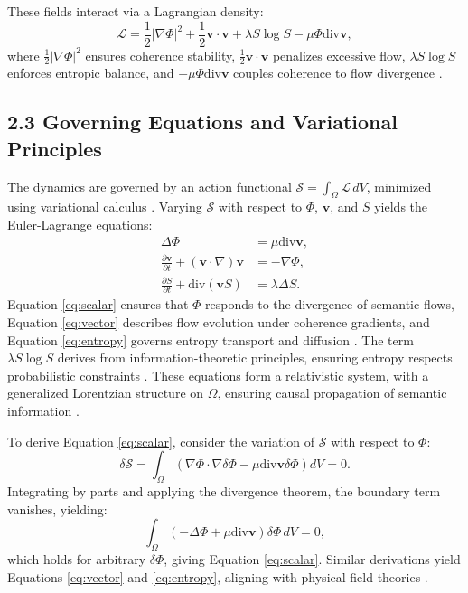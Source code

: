 \documentclass[12pt]{article}
\begin{document}
These fields interact via a Lagrangian density:
\[
\mathcal{L} = \frac{1}{2} |\nabla \Phi|^2 + \frac{1}{2} \mathbf{v} \cdot \mathbf{v} + \lambda S \log S - \mu \Phi \text{div} \mathbf{v},
\]
where \(\frac{1}{2} |\nabla \Phi|^2\) ensures coherence stability, \(\frac{1}{2} \mathbf{v} \cdot \mathbf{v}\) penalizes excessive flow, \(\lambda S \log S\) enforces entropic balance, and \(-\mu \Phi \text{div} \mathbf{v}\) couples coherence to flow divergence \citep{atiyah1969}.

\subsection{2.3 Governing Equations and Variational Principles}

The dynamics are governed by an action functional \(\mathcal{S} = \int_{\Omega} \mathcal{L} \, dV\), minimized using variational calculus \citep{atiyah1969}. Varying \(\mathcal{S}\) with respect to \(\Phi\), \(\mathbf{v}\), and \(S\) yields the Euler-Lagrange equations:
\begin{align}
\Delta \Phi &= \mu \text{div} \mathbf{v}, \label{eq:scalar} \\
\frac{\partial \mathbf{v}}{\partial t} + (\mathbf{v} \cdot \nabla) \mathbf{v} &= -\nabla \Phi, \label{eq:vector} \\
\frac{\partial S}{\partial t} + \text{div} (\mathbf{v} S) &= \lambda \Delta S. \label{eq:entropy}
\end{align}
Equation \eqref{eq:scalar} ensures that \(\Phi\) responds to the divergence of semantic flows, Equation \eqref{eq:vector} describes flow evolution under coherence gradients, and Equation \eqref{eq:entropy} governs entropy transport and diffusion \citep{gromov1999}. The term \(\lambda S \log S\) derives from information-theoretic principles, ensuring entropy respects probabilistic constraints \citep{jaynes2003}. These equations form a relativistic system, with a generalized Lorentzian structure on \(\Omega\), ensuring causal propagation of semantic information \citep{baez2011}.

To derive Equation \eqref{eq:scalar}, consider the variation of \(\mathcal{S}\) with respect to \(\Phi\):
\[
\delta \mathcal{S} = \int_{\Omega} \left( \nabla \Phi \cdot \nabla \delta \Phi - \mu \text{div} \mathbf{v} \delta \Phi \right) dV = 0.
\]
Integrating by parts and applying the divergence theorem, the boundary term vanishes, yielding:
\[
\int_{\Omega} \left( -\Delta \Phi + \mu \text{div} \mathbf{v} \right) \delta \Phi \, dV = 0,
\]
which holds for arbitrary \(\delta \Phi\), giving Equation \eqref{eq:scalar}. Similar derivations yield Equations \eqref{eq:vector} and \eqref{eq:entropy}, aligning with physical field theories \citep{baez2011}.
\end{document}
